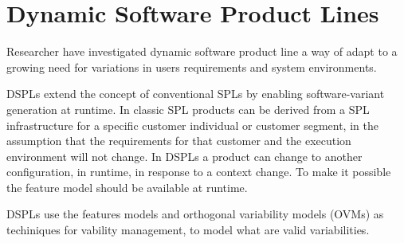 \section{Dynamic Software Product Lines}
Researcher have investigated dynamic software product line a way of adapt to a growing need for variations in users requirements and system environments.

DSPLs extend the concept of conventional SPLs by enabling software-variant generation at runtime. In classic SPL products can be derived from a SPL infrastructure for a specific customer individual or customer segment, in the assumption that the requirements for that customer and the execution environment will not change. In DSPLs a product can change to another configuration, in runtime, in response to a context change. To make it possible the feature model should be available at runtime. \cite{bencomo_view_2012}

DSPLs use the features models and  orthogonal variability models (OVMs) as techiniques for vability management, to model what are valid variabilities.
